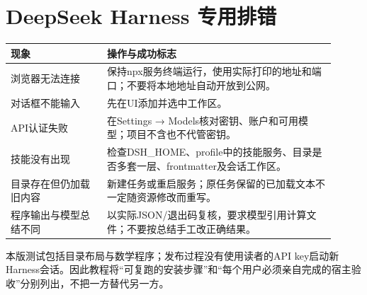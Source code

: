 \section{DeepSeek Harness 专用排错}
\begin{longtable}{p{0.27\linewidth}p{0.64\linewidth}}
\toprule 现象 & 操作与成功标志 \\ \midrule
浏览器无法连接 & 保持npx服务终端运行，使用实际打印的地址和端口；不要将本地地址自动开放到公网。\\
对话框不能输入 & 先在UI添加并选中工作区。\\
API认证失败 & 在Settings → Models核对密钥、账户和可用模型；项目不含也不代管密钥。\\
技能没有出现 & 检查DSH\_HOME、profile中的技能服务、目录是否多套一层、frontmatter及会话工作区。\\
目录存在但仍加载旧内容 & 新建任务或重启服务；原任务保留的已加载文本不一定随资源修改而重写。\\
程序输出与模型总结不同 & 以实际JSON/退出码复核，要求模型引用计算文件；不要按总结手工改正确结果。\\
\bottomrule
\end{longtable}
本版测试包括目录布局与数学程序；发布过程没有使用读者的API key启动新Harness会话。因此教程将“可复跑的安装步骤”和“每个用户必须亲自完成的宿主验收”分别列出，不把一方替代另一方。


